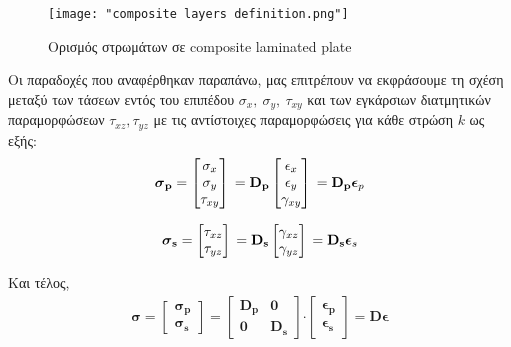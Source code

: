 \begin{figure}[h]
    \centering
    \texttt{[image: "composite layers definition.png"]}
    \caption{Ορισμός στρωμάτων σε \textlatin{composite laminated plate \cite{onate2013}}}
    \label{fig:composite_layers}
\end{figure}


Οι παραδοχές που αναφέρθηκαν παραπάνω, μας επιτρέπουν να εκφράσουμε τη σχέση μεταξύ των τάσεων εντός του επιπέδου $\sigma_{x},\ \sigma_{y},\ \tau_{xy}$ και των εγκάρσιων διατμητικών παραμορφώσεων $\tau_{xz},\tau_{yz}$ με τις αντίστοιχες παραμορφώσεις για κάθε στρώση $k$ ως εξής:
\begin{equation}
    \boldsymbol{\sigma}_{\mathbf{p}} =
    \begin{bmatrix}
        \sigma_{x} \\
        \sigma_{y} \\
        \tau_{xy}
    \end{bmatrix} \\
    = \mathbf{D_p}
    \begin{bmatrix}
        \epsilon_{x} \\
        \epsilon_{y} \\
        \gamma_{xy}
    \end{bmatrix} \\
    = \mathbf{D_p} \boldsymbol{\epsilon}_{p}
\end{equation}
    

\begin{equation}
    \boldsymbol{\sigma}_{\mathbf{s}} = \begin{bmatrix}
    \tau_{xz} \\
    \tau_{yz}
    \end{bmatrix} \\
    = \mathbf{D}_{\mathbf{s}} \begin{bmatrix}
    \gamma_{xz} \\
    \gamma_{yz}
    \end{bmatrix} \\
    = \mathbf{D}_{\mathbf{s}} \boldsymbol{\epsilon}_{s}
    \end{equation}
    

Και τέλος,
\begin{equation}
\begin{array}{r}
\boldsymbol{\sigma}=\begin{bmatrix}
\boldsymbol{\sigma_p} \\
\boldsymbol{\sigma_s}
\end{bmatrix}=\begin{bmatrix}
\mathbf{D}_{\mathbf{p}} & \mathbf{0} \\
\mathbf{0} & \mathbf{D_s}
\end{bmatrix}\mathbf{\cdot}\begin{bmatrix}
\boldsymbol{\epsilon_{p}} \\
\boldsymbol{\epsilon}_{\mathbf{s}}
\end{bmatrix}=\boldsymbol{D\epsilon}
\end{array}
\end{equation}



